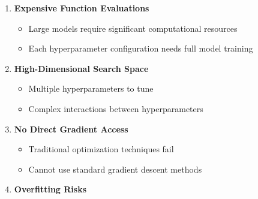 \documentclass[
  letterpaper,
  DIV=11,
  numbers=noendperiod]{scrreprt}
\providecommand{\tightlist}{%
  \setlength{\itemsep}{0pt}\setlength{\parskip}{0pt}}\usepackage{longtable,booktabs,array}
\begin{document}
\begin{enumerate}
\def\labelenumi{\arabic{enumi}.}
\tightlist
\item
  \textbf{Expensive Function Evaluations}

  \begin{itemize}
  \tightlist
  \item
    Large models require significant computational resources
  \item
    Each hyperparameter configuration needs full model training
  \end{itemize}
\item
  \textbf{High-Dimensional Search Space}

  \begin{itemize}
  \tightlist
  \item
    Multiple hyperparameters to tune
  \item
    Complex interactions between hyperparameters
  \end{itemize}
\item
  \textbf{No Direct Gradient Access}

  \begin{itemize}
  \tightlist
  \item
    Traditional optimization techniques fail
  \item
    Cannot use standard gradient descent methods
  \end{itemize}
\item
  \textbf{Overfitting Risks}
\end{enumerate}
\end{document}
